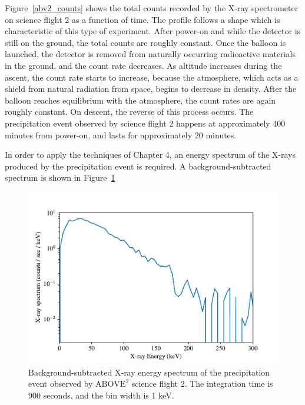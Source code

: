 Figure~\ref{abv2_counts} shows the total counts recorded by the X-ray spectrometer on science flight 2 as a function of time. The profile follows a shape which is characteristic of this type of experiment. After power-on and while the detector is still on the ground, the total counts are roughly constant. Once the balloon is launched, the detector is removed from naturally occurring radioactive materials in the ground, and the count rate decreases. As altitude increases during the ascent, the count rate starts to increase, because the atmosphere, which acts as a shield from natural radiation from space, begins to decrease in density. After the balloon reaches equilibrium with the atmosphere, the count rates are again roughly constant. On descent, the reverse of this process occurs. The precipitation event observed by science flight 2 happens at approximately 400 minutes from power-on, and lasts for approximately 20 minutes.

In order to apply the techniques of Chapter 4, an energy spectrum of the X-rays produced by the precipitation event is required. A background-subtracted spectrum is shown in Figure~\ref{abv2_hist}

\begin{figure}[p]
    \centering
    \includegraphics[width=1.0\textwidth]{figures/chapter_5/abv2_hist/abv2_hist}
    \caption{Background-subtracted X-ray energy spectrum of the precipitation event observed by $\text{ABOVE}^2$ science flight 2. The integration time is 900 seconds, and the bin width is 1 keV.}
    \label{abv2_hist}
\end{figure}














